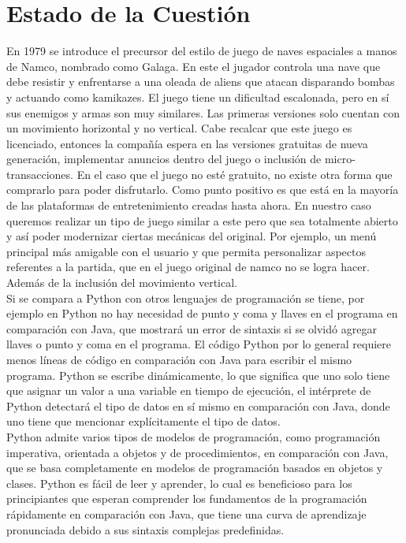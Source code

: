 \documentclass[12pt,letterpaper]{article}
\begin{document}
 \section{Estado de la Cuestión} 
En 1979 se introduce el precursor del estilo de juego de naves espaciales a manos de Namco, nombrado como Galaga. En este el jugador controla una nave que debe resistir y enfrentarse a una oleada de aliens que atacan disparando bombas y actuando como kamikazes. El juego tiene un dificultad escalonada, pero en sí sus enemigos y armas son muy similares. Las primeras versiones solo cuentan con un movimiento horizontal y no vertical. Cabe recalcar que este juego es licenciado, entonces la compañía espera en las versiones gratuitas de nueva generación, implementar anuncios dentro del juego o inclusión de micro-transacciones. En el caso que el juego no esté gratuito, no existe otra forma que comprarlo para poder disfrutarlo. Como punto positivo es que está en la mayoría de las plataformas de entretenimiento creadas hasta ahora. En nuestro caso queremos realizar un tipo de juego similar a este pero que sea totalmente abierto y así poder modernizar ciertas mecánicas del original. Por ejemplo, un menú principal más amigable con el usuario y que permita personalizar aspectos referentes a la partida, que en el juego original de namco no se logra hacer. Además de la inclusión del movimiento vertical.
\vspace{5mm}\\
\indent Si se compara a Python con otros lenguajes de programación se tiene, por ejemplo en Python no hay necesidad de punto y coma y llaves en el programa en comparación con Java, que mostrará un error de sintaxis si se olvidó agregar llaves o punto y coma en el programa. El código Python por lo general requiere menos líneas de código en comparación con Java para escribir el mismo programa. Python se escribe dinámicamente, lo que significa que uno solo tiene que asignar un valor a una variable en tiempo de ejecución, el intérprete de Python detectará el tipo de datos en sí mismo en comparación con Java, donde uno tiene que mencionar explícitamente el tipo de datos. \vspace{5mm}\\
\indent Python admite varios tipos de modelos de programación, como programación imperativa, orientada a objetos y de procedimientos, en comparación con Java, que se basa completamente en modelos de programación basados en objetos y clases.
Python es fácil de leer y aprender, lo cual es beneficioso para los principiantes que esperan comprender los fundamentos de la programación rápidamente en comparación con Java, que tiene una curva de aprendizaje pronunciada debido a sus sintaxis complejas predefinidas.
\end{document}
